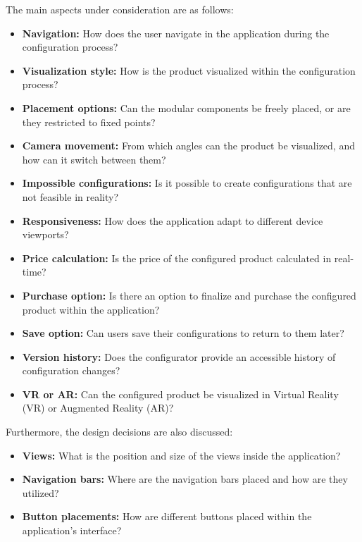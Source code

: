 \noindent The main aspects under consideration are as follows:\nopagebreak
\begin{itemize}[label=\rectanglebullet]
    \item \textbf{Navigation:} How does the user navigate in the application during the configuration process?
    \item \textbf{Visualization style:} How is the product visualized within the configuration process?
    \item \textbf{Placement options:} Can the modular components be freely placed, or are they restricted to fixed points?
    \item \textbf{Camera movement:} From which angles can the product be visualized, and how can it switch between them?
    \item \textbf{Impossible configurations:} Is it possible to create configurations that are not feasible in reality?
    \item \textbf{Responsiveness:} How does the application adapt to different device viewports?
    \item \textbf{Price calculation:} Is the price of the configured product calculated in real-time?
    \item \textbf{Purchase option:} Is there an option to finalize and purchase the configured product within the application?
    \item \textbf{Save option:} Can users save their configurations to return to them later?
    \item \textbf{Version history:} Does the configurator provide an accessible history of configuration changes?
    \item \textbf{VR or AR:} Can the configured product be visualized in Virtual Reality (VR) or Augmented Reality (AR)?
\end{itemize}

\noindent Furthermore, the design decisions are also discussed:\nopagebreak
\begin{itemize}[label=\rectanglebullet]
    \item \textbf{Views:} What is the position and size of the views inside the application?
    \item \textbf{Navigation bars:} Where are the navigation bars placed and how are they utilized?
    \item \textbf{Button placements:} How are different buttons placed within the application's interface?
\end{itemize}


